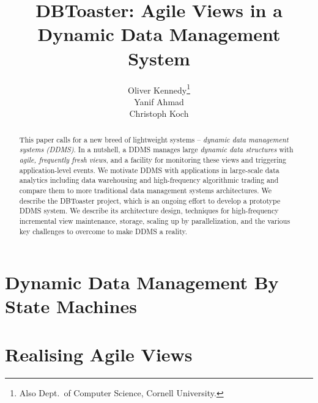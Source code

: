 \documentclass{sig-alternate}
\begin{document}
\title{DBToaster: Agile Views in a\\Dynamic Data Management System}
\author{
\alignauthor
Oliver Kennedy\thanks{Also Dept.\ of Computer Science, Cornell University.}\\
\alignauthor
Yanif Ahmad\\
\alignauthor
Christoph Koch\\
}
\maketitle

\begin{abstract}
This paper calls for a new breed of lightweight systems --
{\em dynamic data management systems (DDMS)}\/.
In a nutshell,
a DDMS manages large {\em dynamic data structures}\/ with 
{\em agile, frequently fresh views}\/, and a facility for monitoring
these views and triggering application-level events.
%
We motivate DDMS with applications in large-scale data analytics
including data warehousing and high-frequency algorithmic trading
and compare them to more traditional data management systems 
architectures.
%
We describe the DBToaster project, which is an ongoing effort to
develop a prototype DDMS system. We describe its architecture
design, techniques for high-frequency incremental view maintenance,
storage, scaling up by parallelization, and
the various key challenges to overcome to make DDMS a reality.
\end{abstract}



\section{Dynamic Data Management By\\State Machines}

\label{sec:overview}


\section{Realising Agile Views}
\label{sec:dbtoaster}

\end{document}
